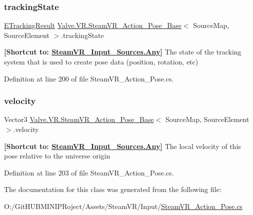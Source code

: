 \subsubsection{\texorpdfstring{trackingState}{trackingState}}
{\footnotesize\ttfamily \mbox{\hyperlink{namespace_valve_1_1_v_r_abe6feab98f33191b7c27b4292012e90a}{E\+Tracking\+Result}} \mbox{\hyperlink{class_valve_1_1_v_r_1_1_steam_v_r___action___pose___base}{Valve.\+V\+R.\+Steam\+V\+R\+\_\+\+Action\+\_\+\+Pose\+\_\+\+Base}}$<$ Source\+Map, Source\+Element $>$.tracking\+State\hspace{0.3cm}{\ttfamily [get]}}



{\bfseries{\mbox{[}Shortcut to\+: \mbox{\hyperlink{namespace_valve_1_1_v_r_a82e5bf501cc3aa155444ee3f0662853faed36a1ef76a59ee3f15180e0441188ad}{Steam\+V\+R\+\_\+\+Input\+\_\+\+Sources.\+Any}}\mbox{]}}} The state of the tracking system that is used to create pose data (position, rotation, etc) 



Definition at line 200 of file Steam\+V\+R\+\_\+\+Action\+\_\+\+Pose.\+cs.

\mbox{\label{class_valve_1_1_v_r_1_1_steam_v_r___action___pose___base_aaf2089c742c29110276191454cda9c7a}} 
\subsubsection{\texorpdfstring{velocity}{velocity}}
{\footnotesize\ttfamily Vector3 \mbox{\hyperlink{class_valve_1_1_v_r_1_1_steam_v_r___action___pose___base}{Valve.\+V\+R.\+Steam\+V\+R\+\_\+\+Action\+\_\+\+Pose\+\_\+\+Base}}$<$ Source\+Map, Source\+Element $>$.velocity\hspace{0.3cm}{\ttfamily [get]}}



{\bfseries{\mbox{[}Shortcut to\+: \mbox{\hyperlink{namespace_valve_1_1_v_r_a82e5bf501cc3aa155444ee3f0662853faed36a1ef76a59ee3f15180e0441188ad}{Steam\+V\+R\+\_\+\+Input\+\_\+\+Sources.\+Any}}\mbox{]}}} The local velocity of this pose relative to the universe origin 



Definition at line 203 of file Steam\+V\+R\+\_\+\+Action\+\_\+\+Pose.\+cs.



The documentation for this class was generated from the following file\+:\begin{DoxyCompactItemize}
\item 
O\+:/\+Git\+H\+U\+B\+M\+I\+N\+I\+P\+Roject/\+Assets/\+Steam\+V\+R/\+Input/\mbox{\hyperlink{_steam_v_r___action___pose_8cs}{Steam\+V\+R\+\_\+\+Action\+\_\+\+Pose.\+cs}}\end{DoxyCompactItemize}
